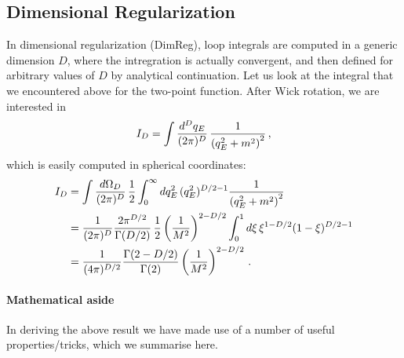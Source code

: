 \subsection{Dimensional Regularization}
\label{sec:dimens-regul}

In dimensional regularization (DimReg), loop integrals are computed in
a generic dimension $D$, where the intregration is actually
convergent, and then defined for arbitrary values of $D$ by analytical
continuation. Let us look at the integral that we encountered above
for the two-point function. After Wick rotation, we are interested in
\begin{equation}
  \label{eq:FirstExDimReg}
  I_D = \int \frac{d^Dq_E}{(2\pi)^D}\, \frac{1}{\left(q_E^2+m^2\right)^2}\, ,
\end{equation}
which is easily computed in spherical coordinates:
\begin{align}
  I_D &= \int \frac{d\Omega_D}{(2\pi)^D}\,
        \frac12 \int_0^\infty dq_E^2\, (q_E^2)^{D/2-1} \frac{1}{\left(q_E^2+m^2\right)^2}
  \\
      &= \frac{1}{(2\pi)^{D}} \frac{2\pi^{D/2}}{\Gamma(D/2)}\,
        \frac12 \left(\frac{1}{M^2}\right)^{2-D/2} \int_0^1 d\xi \,
        \xi^{1-D/2} (1-\xi)^{D/2-1} \\
  \label{eq:IDResult}
      &= \frac{1}{(4\pi)^{D/2}} \frac{\Gamma(2-D/2)}{\Gamma(2)}
        \left(\frac{1}{M^2}\right)^{2-D/2}\, .
\end{align}

\paragraph{Mathematical aside}

In deriving the above result we have made use of a number of useful
properties/tricks, which we summarise here.

